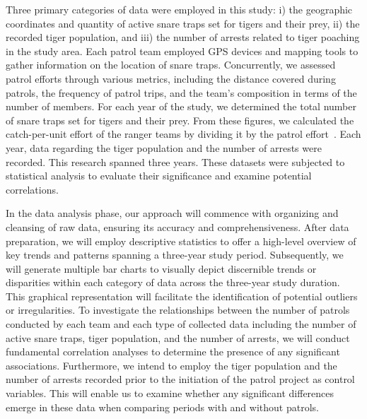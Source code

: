\documentclass[11pt]{article}
\begin{document}
Three primary categories of data were employed in this study: i) the geographic coordinates and quantity of active snare traps set for tigers and their prey, ii) the recorded tiger population, and iii) the number of arrests related to tiger poaching in the study area. Each patrol team employed GPS devices and mapping tools to gather information on the location of snare traps. Concurrently, we assessed patrol efforts through various metrics, including the distance covered during patrols, the frequency of patrol trips, and the team's composition in terms of the number of members. For each year of the study, we determined the total number of snare traps set for tigers and their prey. From these figures, we calculated the catch-per-unit effort of the ranger teams by dividing it by the patrol effort~\cite{RISDIANTO2016306}. Each year, data regarding the tiger population and the number of arrests were recorded. This research spanned three years. These datasets were subjected to statistical analysis to evaluate their significance and examine potential correlations.

In the data analysis phase, our approach will commence with organizing and cleansing of raw data, ensuring its accuracy and comprehensiveness. After data preparation, we will employ descriptive statistics to offer a high-level overview of key trends and patterns spanning a three-year study period. Subsequently, we will generate multiple bar charts to visually depict discernible trends or disparities within each category of data across the three-year study duration. This graphical representation will facilitate the identification of potential outliers or irregularities. To investigate the relationships between the number of patrols conducted by each team and each type of collected data including the number of active snare traps, tiger population, and the number of arrests, we will conduct fundamental correlation analyses to determine the presence of any significant associations. Furthermore, we intend to employ the tiger population and the number of arrests recorded prior to the initiation of the patrol project as control variables. This will enable us to examine whether any significant differences emerge in these data when comparing periods with and without patrols. 
\end{document}
